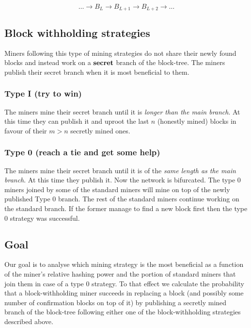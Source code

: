 \documentclass[letterpaper,12pt]{report}
\theoremstyle{plain}
\theoremstyle{definition}
\begin{document}
\begin{equation}\label{theblockchain}\nonumber
\dots\rightarrow\mathit{B}_L\rightarrow\mathit{B}_{L+1}\rightarrow\mathit{B}_{L+2}\rightarrow\dots
\end{equation}

\subsection{Block withholding strategies}
Miners following this type of mining strategies do not share their newly found blocks and instead work on a $\bf{secret}$ branch of the block-tree. The miners publish their secret branch when it is most beneficial to them. 

\subsubsection{Type I (try to win)}
The miners mine their secret branch until it is \textit{longer than the main branch}. At this time they can publish it and uproot the last $n$ (honestly mined) blocks in favour of their $m>n$ secretly mined ones.

\subsubsection{Type 0 (reach a tie and get some help)}
The miners mine their secret branch until it is of the  \textit{same length as the main branch}. At this time they publish it. Now the network is bifurcated. The type 0 miners joined by some of the standard miners will mine on top of the newly published Type 0 branch. The rest of the standard miners continue working on the standard branch. If the former manage to find a new block first then the type 0 strategy was successful. 

\subsection{Goal}\label{subsec:goal}

Our goal is to analyse which mining strategy is the most beneficial as a function of the miner's relative hashing power and the portion of standard miners that join them in case of a type 0 strategy.
To that effect we calculate the probability that a block-withholding miner succeeds in replacing a block (and possibly some number of confirmation blocks on top of it) by publishing a secretly mined branch of the block-tree following either one of the block-withholding strategies described above.
\end{document}
